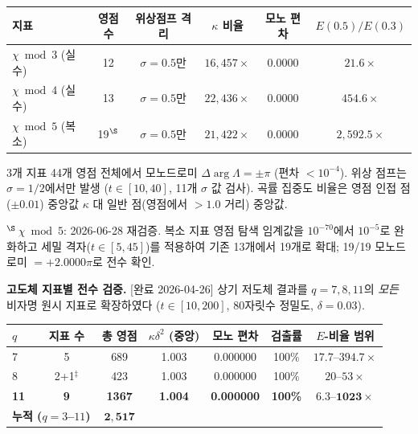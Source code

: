 \documentclass[11pt, a4paper]{article}
\theoremstyle{definition}
\theoremstyle{plain}
\begin{document}
\begin{center}
\small
\begin{tabular}{lccccc}
\toprule
\textbf{지표} & \textbf{영점수} & \textbf{위상점프 격리}
  & \textbf{$\kappa$ 비율} & \textbf{모노 편차}
  & \textbf{$E(0.5)/E(0.3)$} \\
\midrule
$\chi\bmod 3$ (실수)    & 12 & $\sigma{=}0.5$만 & $16{,}457\times$ & 0.0000 & $21.6\times$ \\
$\chi\bmod 4$ (실수)    & 13 & $\sigma{=}0.5$만 & $22{,}436\times$ & 0.0000 & $454.6\times$ \\
$\chi\bmod 5$ (복소) & 19${}^{\S}$ & $\sigma{=}0.5$만 & $21{,}422\times$ & 0.0000 & $2{,}592.5\times$ \\
\bottomrule
\end{tabular}
\end{center}

\noindent
3개 지표 44개 영점 전체에서 모노드로미 $\Delta\arg\Lambda = \pm\pi$ (편차 $< 10^{-4}$). 위상 점프는 $\sigma = 1/2$에서만 발생 ($t\in[10,40]$, 11개 $\sigma$ 값 검사). 곡률 집중도 비율은 영점 인접 점($\pm 0.01$) 중앙값 $\kappa$ 대 일반 점(영점에서 $>1.0$ 거리) 중앙값.

\smallskip\noindent
${}^{\S}$\,$\chi\bmod 5$: 2026-06-28 재검증. 복소 지표 영점 탐색 임계값을 $10^{-70}$에서 $10^{-5}$로 완화하고 세밀 격자($t\in[5,45]$)를 적용하여 기존 13개에서 19개로 확대; 19/19 모노드로미 $= +2.0000\pi$로 전수 확인.

\medskip\noindent
\textbf{고도체 지표별 전수 검증.}
[완료 2026-04-26]
상기 저도체 결과를 $q = 7, 8, 11$의 \emph{모든} 비자명 원시 지표로 확장하였다
($t\in[10,200]$, 80자릿수 정밀도, $\delta{=}0.03$).

\begin{center}
\small
\begin{tabular}{lcccccc}
\toprule
$q$ & 지표 수 & 총 영점 & $\kappa\delta^2$ (중앙) & 모노 편차 & 검출률 & $E$-비율 범위 \\
\midrule
7 & 5 & 689 & 1.003 & 0.000000 & 100\% & $17.7$--$394.7\times$ \\
8 & 2+1${}^\ddagger$ & 423 & 1.003 & 0.000000 & 100\% & $20$--$53\times$ \\
\textbf{11} & \textbf{9} & \textbf{1367} & \textbf{1.004} & \textbf{0.000000} & \textbf{100\%} & $\mathbf{6.3}$--$\mathbf{1023\times}$ \\
\midrule
\multicolumn{2}{l}{\textbf{누적 ($q = 3$--$11$)}} & $\mathbf{2{,}517}$ & & & & \\
\bottomrule
\end{tabular}
\end{center}
\end{document}
